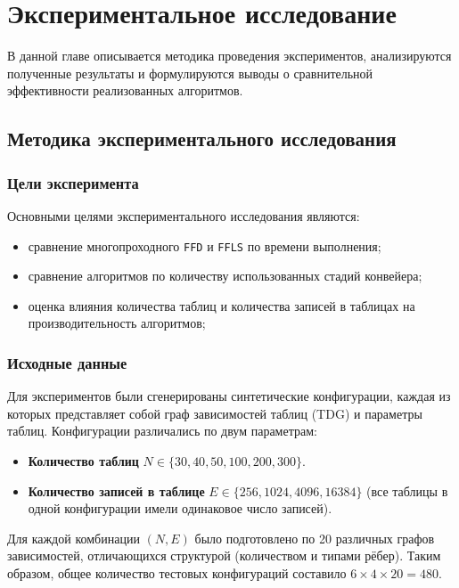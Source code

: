 \section{Экспериментальное исследование}
\label{sec:Chapter6} 

В данной главе описывается методика проведения экспериментов, анализируются полученные результаты и формулируются выводы о сравнительной эффективности реализованных алгоритмов.

\subsection{Методика экспериментального исследования}

\subsubsection{Цели эксперимента}

Основными целями экспериментального исследования являются:
\begin{itemize}
	\item сравнение многопроходного \texttt{FFD} и \texttt{FFLS} по времени выполнения;
	\item сравнение алгоритмов по количеству использованных стадий конвейера;
	\item оценка влияния количества таблиц и количества записей в таблицах на производительность алгоритмов;
\end{itemize}

\subsubsection{Исходные данные}

Для экспериментов были сгенерированы синтетические конфигурации, каждая из которых представляет собой граф зависимостей таблиц (TDG) и параметры таблиц. Конфигурации различались по двум параметрам:

\begin{itemize}
	\item \textbf{Количество таблиц} $N \in \{30, 40, 50, 100, 200, 300\}$.
	\item \textbf{Количество записей в таблице} $E \in \{256, 1024, 4096, 16384\}$ (все таблицы в одной конфигурации имели одинаковое число записей).
\end{itemize}

Для каждой комбинации $(N, E)$ было подготовлено по 20 различных графов зависимостей, отличающихся структурой (количеством и типами рёбер). Таким образом, общее количество тестовых конфигураций составило $6 \times 4 \times 20 = 480$. 

